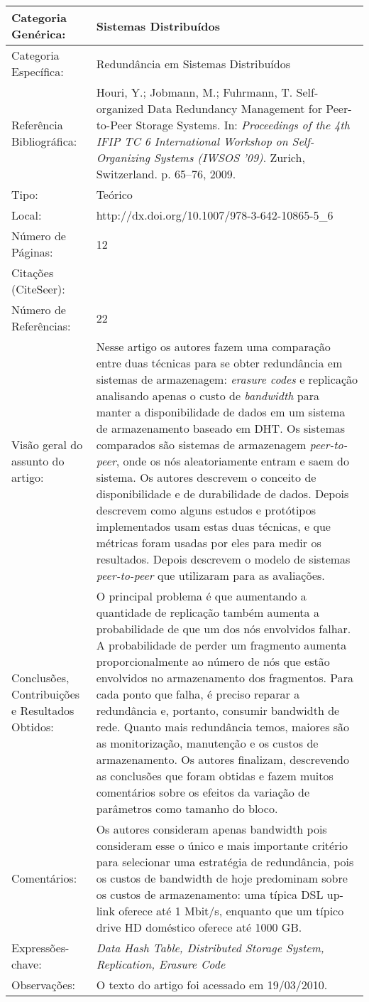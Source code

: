 \documentclass[10pt,a4paper]{article}
\begin{document}
\begin{center}
\begin{tabular}{|p{5cm}||p{10cm}|}
\hline
Categoria Genérica: & Sistemas Distribuídos\\\hline
Categoria Específica: & Redundância em Sistemas Distribuídos\\\hline
Referência Bibliográfica: & Houri, Y.; Jobmann, M.; Fuhrmann, T. Self-organized Data Redundancy Management for Peer-to-Peer Storage Systems. In: \emph{Proceedings of the 4th IFIP TC 6 International Workshop on Self-Organizing Systems (IWSOS '09)}. Zurich, Switzerland. p. 65--76, 2009.\\\hline
Tipo: & Teórico\\\hline
Local: & http://dx.doi.org/10.1007/978-3-642-10865-5\_6\\\hline 
Número de Páginas: & 12\\\hline
Citações (CiteSeer): & \\\hline
Número de Referências: & 22\\\hline
Visão geral do assunto do artigo: & Nesse artigo os autores fazem uma comparação entre duas técnicas para se obter redundância em sistemas de armazenagem: \emph{erasure codes} e replicação analisando apenas o custo de \emph{bandwidth} para manter a disponibilidade de dados em um sistema de armazenamento baseado em DHT. Os sistemas comparados são sistemas de armazenagem \emph{peer-to-peer}, onde os nós aleatoriamente entram e saem do sistema. Os autores descrevem o conceito de disponibilidade e de durabilidade de dados. Depois descrevem como alguns estudos e protótipos implementados usam estas duas técnicas, e que métricas foram usadas por eles para medir os resultados. Depois descrevem o modelo de sistemas \emph{peer-to-peer} que utilizaram para as avaliações. \\\hline
Conclusões, Contribuições e Resultados Obtidos: & O principal problema é que aumentando a quantidade de replicação também aumenta a probabilidade de que um dos nós envolvidos falhar. A probabilidade de perder um fragmento aumenta proporcionalmente ao número de nós que estão envolvidos no armazenamento dos fragmentos. Para cada ponto que falha, é preciso reparar a redundância e, portanto, consumir bandwidth de rede. Quanto mais redundância temos, maiores são as monitorização, manutenção e os custos de armazenamento. Os autores finalizam, descrevendo as conclusões que foram obtidas e fazem muitos comentários sobre os efeitos da variação de parâmetros como tamanho do bloco.\\\hline
Comentários: & Os autores consideram apenas bandwidth pois consideram esse o único e mais importante critério para selecionar uma estratégia de redundância, pois os custos de bandwidth de hoje predominam sobre os custos de armazenamento: uma típica DSL up-link oferece até 1 Mbit/s, enquanto que um típico drive HD doméstico oferece até 1000 GB.\\\hline
Expressões-chave: & \emph{Data Hash Table, Distributed Storage System, Replication, Erasure Code}\\\hline
Observações: & O texto do artigo foi acessado em 19/03/2010.\\\hline


\end{tabular}
\end{center}
\end{document}
